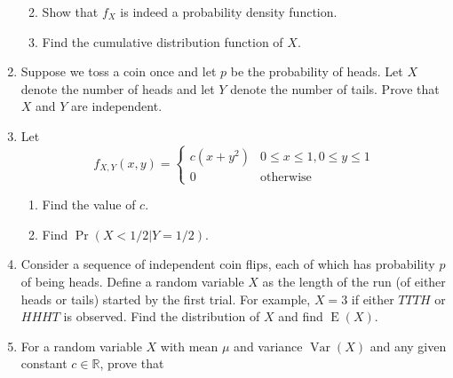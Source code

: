 \documentclass[
]{book}
\providecommand{\tightlist}{%
  \setlength{\itemsep}{0pt}\setlength{\parskip}{0pt}}
\DeclareMathOperator{\E}{E}
\DeclareMathOperator{\Var}{Var}
\newcommand{\bbR}{\mathbb{R}}
\theoremstyle{definition}
\theoremstyle{definition}
\theoremstyle{definition}
\theoremstyle{definition}
\theoremstyle{remark}
\begin{document}
\begin{enumerate}
  \begin{enumerate}
  \def\labelenumii{(\alph{enumii})}
  \tightlist
  \item
    Show that \(f_X\) is indeed a probability density function.
  \item
    Find the cumulative distribution function of \(X\).
  \end{enumerate}
\item
  Suppose we toss a coin once and let \(p\) be the probability of heads. Let \(X\) denote the number of heads and let \(Y\) denote the number of tails. Prove that \(X\) and \(Y\) are independent.
\item
  Let
  \[
  f_{X,Y}(x,y) = \begin{cases}
   c(x+y^2) &0\leq x \leq 1, 0\leq y \leq 1 \\
   0&\text{otherwise}
  \end{cases}
  \]

  \begin{enumerate}
  \def\labelenumii{(\alph{enumii})}
  \tightlist
  \item
    Find the value of \(c\).
  \item
    Find \(\Pr(X<1/2 | Y=1/2)\).
  \end{enumerate}
\item
  Consider a sequence of independent coin flips, each of which has probability \(p\) of being heads. Define a random variable \(X\) as the length of the run (of either heads or tails) started by the first trial. For example, \(X=3\) if either \(TTTH\) or \(HHHT\) is observed. Find the distribution of \(X\) and find \(\E(X)\).
\item
  For a random variable \(X\) with mean \(\mu\) and variance \(\Var(X)\) and any given constant \(c\in\bbR\), prove that


\end{enumerate}
\end{document}
